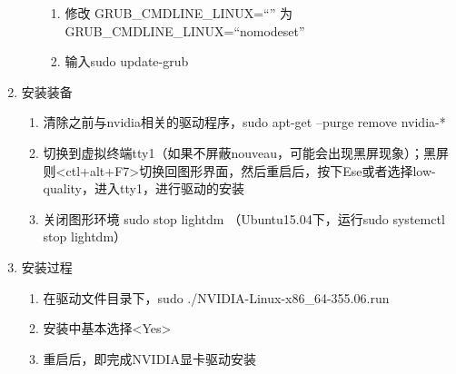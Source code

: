 \begin{enumerate}
\begin{itemize}
\begin{enumerate}
	    \item 修改 GRUB\_CMDLINE\_LINUX=``'' 为 GRUB\_CMDLINE\_LINUX=``nomodeset''
	    \item 输入sudo update-grub
	    \end{enumerate}	
	\end{itemize}
\item 安装装备
	\begin{enumerate}
	\item 清除之前与nvidia相关的驱动程序，sudo apt-get --purge remove nvidia-*  
	\item <ctl+alt+F1>切换到虚拟终端tty1（如果不屏蔽nouveau，可能会出现黑屏现象）；黑屏则<ctl+alt+F7>切换回图形界面，然后重启后，按下Ese或者选择low-quality，进入tty1，进行驱动的安装
	\item 关闭图形环境  sudo stop lightdm （Ubuntu15.04下，运行sudo systemctl stop lightdm）
	\end{enumerate}

\item 安装过程 
	\begin{enumerate}
	\item 在驱动文件目录下，sudo ./NVIDIA-Linux-x86\_64-355.06.run
	\item 安装中基本选择<Yes>
	\item 重启后，即完成NVIDIA显卡驱动安装
	\end{enumerate}
\end{enumerate}

